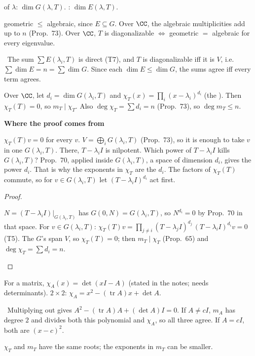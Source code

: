 \documentclass[10pt]{scrartcl}
\DeclareMathOperator{\tr}{tr}
\newcommand{\why}[1]{\par\vspace{2pt}{\color{OliveGreen!70!black}\textbf{Why.}}\ #1\par}
\newenvironment{motive}{\begin{mdframed}[style=thinkbox]\textbf{\color{OliveGreen!75!black}Where the proof comes from}\begin{description}[leftmargin=0.9em,labelindent=0pt,itemsep=2pt,topsep=2pt,font=\normalfont\bfseries\color{OliveGreen!70!black}]}{\end{description}\end{mdframed}}
\newenvironment{steps}{\begin{enumerate}[label=\arabic*.,leftmargin=1.5em,itemsep=2pt,topsep=2pt]}{\end{enumerate}}
\begin{document}
\begin{definition*}[Def.~38]
   of $\lambda$: $\dim G(\lambda,T)$. : $\dim E(\lambda,T)$.
\end{definition*}
\begin{itemize}
  \ii geometric $\le$ algebraic, since $E\subseteq G$.
  \ii Over $\CC$, the algebraic multiplicities add up to $n$ (Prop.~73).
  \ii Over $\CC$, $T$ is diagonalizable $\iff$ geometric $=$ algebraic for every eigenvalue.
  \why{The sum $\sum E(\lambda_i,T)$ is direct (T7), and $T$ is diagonalizable iff it is $V$, i.e.\ $\sum\dim E=n=\sum\dim G$. Since each $\dim E\le\dim G$, the sums agree iff every term agrees.}
\end{itemize}

\begin{theorem*}
  Over $\CC$, let $d_i=\dim G(\lambda_i,T)$ and $\chi_T(x)=\prod_i(x-\lambda_i)^{d_i}$ (the ). Then $\chi_T(T)=0$, so $m_T\mid\chi_T$. Also $\deg\chi_T=\sum d_i=n$ (Prop.~73), so $\deg m_T\le n$.
\end{theorem*}
\begin{motive}
  \ii[Want.] $\chi_T(T)v=0$ for every $v$.
  \ii[Know.] $V=\bigoplus_iG(\lambda_i,T)$ (Prop.~73), so it is enough to take $v$ in one $G(\lambda_i,T)$. There, $T-\lambda_iI$ is nilpotent.
   Which power of $T-\lambda_iI$ kills $G(\lambda_i,T)$? Prop.~70, applied inside $G(\lambda_i,T)$, a space of dimension $d_i$, gives the power $d_i$. That is why the exponents in $\chi_T$ are the $d_i$.
   The factors of $\chi_T(T)$ commute, so for $v\in G(\lambda_i,T)$ let $(T-\lambda_iI)^{d_i}$ act first.
\end{motive}
\begin{proof}
  \begin{steps}
    \ii $N=(T-\lambda_iI)|_{G(\lambda_i,T)}$ has $G(0,N)=G(\lambda_i,T)$, so $N^{d_i}=0$ by Prop.~70 in that space.
    \ii For $v\in G(\lambda_i,T)$: $\chi_T(T)v=\prod_{j\ne i}(T-\lambda_jI)^{d_j}\,(T-\lambda_iI)^{d_i}v=0$ (T5).
    \ii The $G$'s span $V$, so $\chi_T(T)=0$; then $m_T\mid\chi_T$ (Prop.~65) and $\deg\chi_T=\sum d_i=n$.
  \end{steps}
\end{proof}
\begin{itemize}
  \ii For a matrix, $\chi_A(x)=\det(xI-A)$ (stated in the notes; needs determinants).
  \ii $2\times2$: $\chi_A=x^2-(\tr A)x+\det A$.
  \why{Multiplying out gives $A^2-(\tr A)A+(\det A)I=0$. If $A\ne cI$, $m_A$ has degree $2$ and divides both this polynomial and $\chi_A$, so all three agree. If $A=cI$, both are $(x-c)^2$.}
  \ii $\chi_T$ and $m_T$ have the same roots; the exponents in $m_T$ can be smaller.
\end{itemize}
\end{document}
